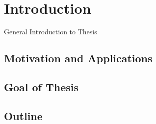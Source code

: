 \chapter{Introduction}\label{ch:introduction}
General Introduction to Thesis

\section{Motivation and Applications}\label{sec:motivation}

\section{Goal of Thesis}\label{sec:goal}

\section{Outline}\label{sec:outline}




